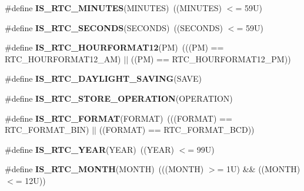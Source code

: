 \begin{DoxyCompactItemize}
\item 
\mbox{\label{group___r_t_c___i_s___r_t_c___definitions_ga8475ceaf2d35d98be0b3401812aef445}} 
\#define {\bfseries I\+S\+\_\+\+R\+T\+C\+\_\+\+M\+I\+N\+U\+T\+ES}(M\+I\+N\+U\+T\+ES)~((M\+I\+N\+U\+T\+ES) $<$= 59\+U)
\item 
\mbox{\label{group___r_t_c___i_s___r_t_c___definitions_gadb5a39d98fc906a8ea035bd29308bc5c}} 
\#define {\bfseries I\+S\+\_\+\+R\+T\+C\+\_\+\+S\+E\+C\+O\+N\+DS}(S\+E\+C\+O\+N\+DS)~((S\+E\+C\+O\+N\+DS) $<$= 59\+U)
\item 
\mbox{\label{group___r_t_c___i_s___r_t_c___definitions_gaac5777b612cdee4c43d4399f40b1bd3a}} 
\#define {\bfseries I\+S\+\_\+\+R\+T\+C\+\_\+\+H\+O\+U\+R\+F\+O\+R\+M\+A\+T12}(PM)~(((PM) == R\+T\+C\+\_\+\+H\+O\+U\+R\+F\+O\+R\+M\+A\+T12\+\_\+\+AM) $\vert$$\vert$ ((PM) == R\+T\+C\+\_\+\+H\+O\+U\+R\+F\+O\+R\+M\+A\+T12\+\_\+\+PM))
\item 
\#define {\bfseries I\+S\+\_\+\+R\+T\+C\+\_\+\+D\+A\+Y\+L\+I\+G\+H\+T\+\_\+\+S\+A\+V\+I\+NG}(S\+A\+VE)
\item 
\#define {\bfseries I\+S\+\_\+\+R\+T\+C\+\_\+\+S\+T\+O\+R\+E\+\_\+\+O\+P\+E\+R\+A\+T\+I\+ON}(O\+P\+E\+R\+A\+T\+I\+ON)
\item 
\mbox{\label{group___r_t_c___i_s___r_t_c___definitions_ga05a1ca8558058d71322ccf1045b8fb1c}} 
\#define {\bfseries I\+S\+\_\+\+R\+T\+C\+\_\+\+F\+O\+R\+M\+AT}(F\+O\+R\+M\+AT)~(((F\+O\+R\+M\+AT) == R\+T\+C\+\_\+\+F\+O\+R\+M\+A\+T\+\_\+\+B\+IN) $\vert$$\vert$ ((F\+O\+R\+M\+AT) == R\+T\+C\+\_\+\+F\+O\+R\+M\+A\+T\+\_\+\+B\+CD))
\item 
\mbox{\label{group___r_t_c___i_s___r_t_c___definitions_gae59c9cfe6f9532ab26d74c25bcbe814b}} 
\#define {\bfseries I\+S\+\_\+\+R\+T\+C\+\_\+\+Y\+E\+AR}(Y\+E\+AR)~((Y\+E\+AR) $<$= 99\+U)
\item 
\mbox{\label{group___r_t_c___i_s___r_t_c___definitions_ga7fa60f17b2ae529c35b1fa3dd4d6853f}} 
\#define {\bfseries I\+S\+\_\+\+R\+T\+C\+\_\+\+M\+O\+N\+TH}(M\+O\+N\+TH)~(((M\+O\+N\+TH) $>$= 1\+U) \&\& ((\+M\+O\+N\+T\+H) $<$= 12\+U))

\end{DoxyCompactItemize}
